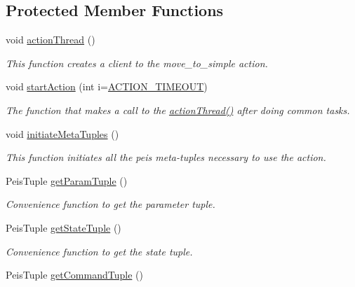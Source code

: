 \subsection*{\-Protected \-Member \-Functions}
\begin{DoxyCompactItemize}
\item 
void \hyperlink{classexekutor_1_1MoveToSimpleExekutor_ac7e190c5953e9f3dd8246138745b8b8b}{action\-Thread} ()
\begin{DoxyCompactList}\small\item\em \-This function creates a client to the move\-\_\-to\-\_\-simple action. \end{DoxyCompactList}\item 
void \hyperlink{classexekutor_1_1ActionExekutor_ab654dafa7b307003c35124509e3d8505}{start\-Action} (int i=\hyperlink{action__exekutor_8h_a5b040d9757224739efa101219b820edc}{\-A\-C\-T\-I\-O\-N\-\_\-\-T\-I\-M\-E\-O\-U\-T})
\begin{DoxyCompactList}\small\item\em \-The function that makes a call to the \hyperlink{classexekutor_1_1ActionExekutor_ab80a1327f11113222157cfec0abd9e9b}{action\-Thread()} after doing common tasks. \end{DoxyCompactList}\item 
void \hyperlink{classexekutor_1_1ActionExekutor_ae2f81a4994766a040bf6fa1cf36fbfb5}{initiate\-Meta\-Tuples} ()
\begin{DoxyCompactList}\small\item\em \-This function initiates all the peis meta-\/tuples necessary to use the action. \end{DoxyCompactList}\item 
\-Peis\-Tuple \hyperlink{classexekutor_1_1ActionExekutor_ac1e62ad386692ab2cd7e8ae2173f1eb5}{get\-Param\-Tuple} ()
\begin{DoxyCompactList}\small\item\em \-Convenience function to get the parameter tuple. \end{DoxyCompactList}\item 
\-Peis\-Tuple \hyperlink{classexekutor_1_1ActionExekutor_aad1e82b7d1c173dd1c8f81967d7374b3}{get\-State\-Tuple} ()
\begin{DoxyCompactList}\small\item\em \-Convenience function to get the state tuple. \end{DoxyCompactList}\item 
\-Peis\-Tuple \hyperlink{classexekutor_1_1ActionExekutor_a1c1f3fdb9bd439a014fa3af470eb250a}{get\-Command\-Tuple} ()

\end{DoxyCompactItemize}
